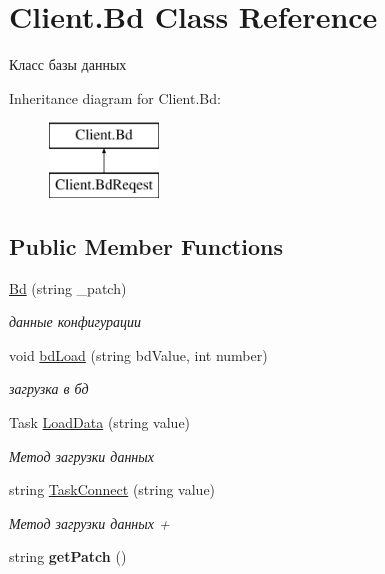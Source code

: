 \hypertarget{class_client_1_1_bd}{}\section{Client.\+Bd Class Reference}
\label{class_client_1_1_bd}


Класс базы данных  


Inheritance diagram for Client.\+Bd\+:\begin{figure}[H]
\begin{center}
\leavevmode
\includegraphics[height=2.000000cm]{class_client_1_1_bd}
\end{center}
\end{figure}
\subsection*{Public Member Functions}
\begin{DoxyCompactItemize}
\item 
\hyperlink{class_client_1_1_bd_a66346f172528dd64f567b7687afb1a33}{Bd} (string \+\_\+patch)
\begin{DoxyCompactList}\small\item\em данные конфигурации \end{DoxyCompactList}\item 
void \hyperlink{class_client_1_1_bd_ad4e3f2477942897e846e3cf247419518}{bd\+Load} (string bd\+Value, int number)
\begin{DoxyCompactList}\small\item\em загрузка в бд \end{DoxyCompactList}\item 
Task \hyperlink{class_client_1_1_bd_a39c09d734ca537c31b51af1f0a3ef84c}{Load\+Data} (string value)
\begin{DoxyCompactList}\small\item\em Метод загрузки данных \end{DoxyCompactList}\item 
string \hyperlink{class_client_1_1_bd_a1127b7b1b53edf9e1b86c4292a1e91cd}{Task\+Connect} (string value)
\begin{DoxyCompactList}\small\item\em Метод загрузки данных + \end{DoxyCompactList}\item 
\hypertarget{class_client_1_1_bd_ad831f343ca4a5ea39a875c6f52eeeb78}{}\label{class_client_1_1_bd_ad831f343ca4a5ea39a875c6f52eeeb78} 
string {\bfseries get\+Patch} ()
\end{DoxyCompactItemize}
